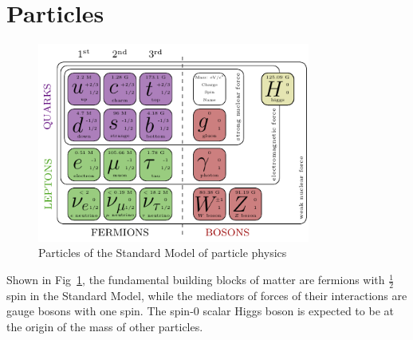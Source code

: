 \section{Particles}
\begin{figure}[htbp]
  \begin{center}
    \includegraphics[width=0.8\textwidth]{chapters/c1/figures/SM-particle-table}
  \end{center}
  \caption{Particles of the Standard Model of particle physics}
  \label{fig:c1Standard Modelparticletable}
\end{figure}
\par Shown in Fig~\ref{fig:c1Standard Modelparticletable}, the fundamental building blocks of matter are fermions with $\frac{1}{2}$ 
spin in the Standard Model, while the mediators of forces of their interactions are gauge bosons with one spin. 
The spin-0 scalar Higgs boson is expected to be at the origin of the mass of other particles.

